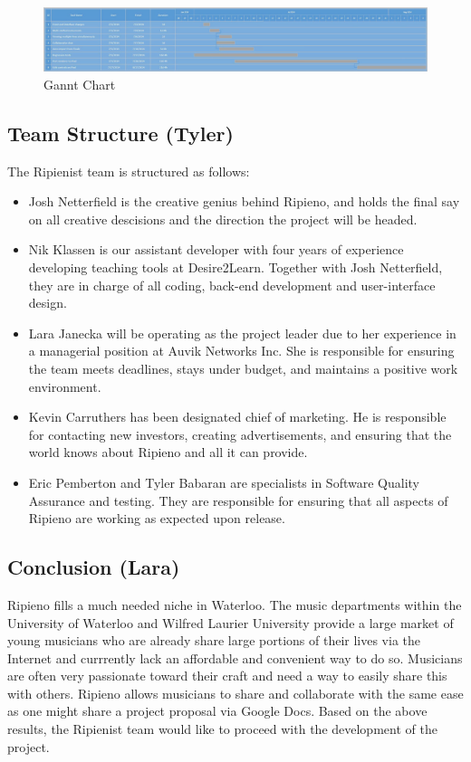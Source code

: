 \documentclass[12pt]{article}
\begin{document}
\begin{figure}[ht]
\centering
\includegraphics[width=\textwidth]{gannt.jpg}
\caption{Gannt Chart}
\end{figure}

\subsection{Team Structure (Tyler)}
The Ripienist team is structured as follows:
\begin{itemize}
\item Josh Netterfield is the creative genius behind Ripieno, and holds the final say on all creative descisions and the direction the project will be headed.
\item Nik Klassen is our assistant developer with four years of experience developing teaching tools at Desire2Learn. Together with Josh Netterfield, they are in charge of all coding, back-end development and user-interface design.
\item Lara Janecka will be operating as the project leader due to her experience in a managerial position at Auvik Networks Inc. She is responsible for ensuring the team meets deadlines, stays under budget, and maintains a positive work environment.
\item Kevin Carruthers has been designated chief of marketing. He is responsible for contacting new investors, creating advertisements, and ensuring that the world knows about Ripieno and all it can provide.
\item Eric Pemberton and Tyler Babaran are specialists in Software Quality Assurance and testing. They are responsible for ensuring that all aspects of Ripieno are working as expected upon release.
\end{itemize}

\subsection{Conclusion (Lara)}
Ripieno fills a much needed niche in Waterloo. The music departments within the University of Waterloo and Wilfred Laurier University provide a large market of young musicians who are already share large portions of their lives via the Internet and currrently lack an affordable and convenient way to do so. Musicians are often very passionate toward their craft and need a way to easily share this with others. Ripieno allows musicians to share and collaborate with the same ease as one might share a project proposal via Google Docs. Based on the above results, the Ripienist team would like to proceed with the development of the project.
\newpage
\end{document}
